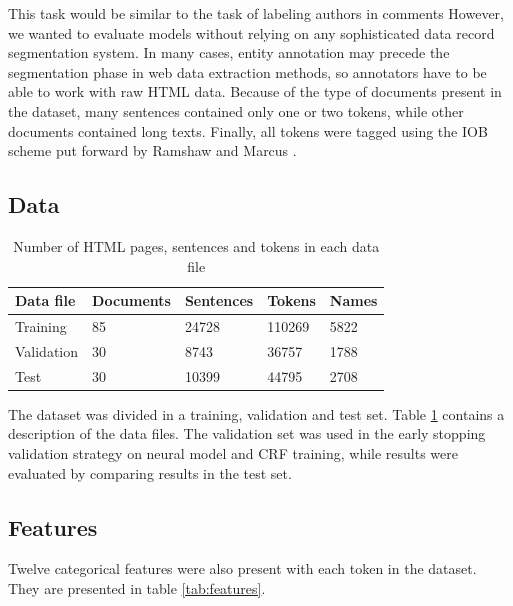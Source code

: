\documentclass[sigconf]{acmart}
\begin{document}
This task would be similar to the task of labeling authors in comments
However, we wanted to evaluate models without relying on any sophisticated data record
segmentation system. In many cases, entity annotation may precede the segmentation
phase in web data extraction methods, so annotators have to be able to work with
raw HTML data. Because of the type of documents present in the dataset, many sentences 
contained only one or two tokens, while other documents contained long texts.
Finally, all tokens were tagged using the IOB scheme put forward by
Ramshaw and Marcus \cite{Ramshaw1995}. 

\subsection{Data}

\begin{table}[h]
  \small
  \begin{center}
    \begin{tabular}{ lllll }
      \toprule
      Data file & Documents & Sentences & Tokens & Names \\
      \midrule
      Training    & 85 & 24728 & 110269 & 5822 \\  
      Validation  & 30 & 8743  & 36757  & 1788 \\
      Test        & 30 & 10399 & 44795  & 2708 \\
      \bottomrule
    \end{tabular}
  \end{center}
  \caption{Number of HTML pages, sentences and tokens in each data file}
  \label{tab:dataset}
\end{table}

The dataset was divided in a training, validation and test set. Table \ref{tab:dataset} contains
a description of the data files. The validation set was used in the early stopping validation strategy
on neural model and CRF training, while results were evaluated by comparing results in the test set.

\subsection{Features}

Twelve categorical features were also present with each token in the dataset. They 
are presented in table \ref{tab:features}.
\end{document}
